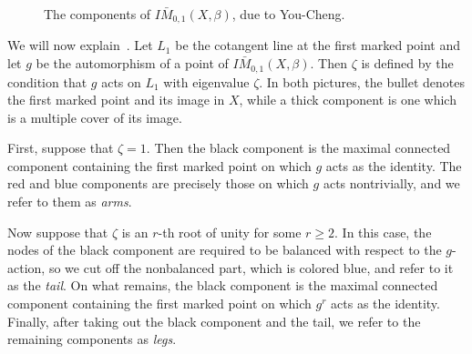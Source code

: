 \documentclass{amsart}
\theoremstyle{definition}
\theoremstyle{remark}
\theoremstyle{plain}
\theoremstyle{definition}
\theoremstyle{remark}
\newcommand{\1}{\mathbf{1}}
\newcommand{\2}{\mathbf{2}}
\newcommand{\3}{\mathbf{3}}
\begin{document}
\begin{figure}[htpb]
    \caption{The components of \(I\bar{M}_{0,1}(X,\beta)\), due to You-Cheng.}
    \label{fig:adelic-components}
\end{figure}

We will now explain~. Let \(L_1\) be the cotangent line at the first marked point and let \(g\) be the automorphism of a point of \(I\bar{M}_{0,1}(X,\beta)\). Then \(\zeta\) is defined by the condition that \(g\) acts on \(L_1\) with eigenvalue \(\zeta\). In both pictures, the bullet denotes the first marked point and its image in \(X\), while a thick component is one which is a multiple cover of its image.

First, suppose that \(\zeta = 1\). Then the black component is the maximal connected component containing the first marked point on which \(g\) acts as the identity. The red and blue components are precisely those on which \(g\) acts nontrivially, and we refer to them as \textit{arms}.

Now suppose that \(\zeta\) is an \(r\)-th root of unity for some \(r \geq 2\). In this case, the nodes of the black component are required to be balanced with respect to the \(g\)-action, so we cut off the nonbalanced part, which is colored blue, and refer to it as the \textit{tail}. On what remains, the black component is the maximal connected component containing the first marked point on which \(g^r\) acts as the identity. Finally, after taking out the black component and the tail, we refer to the remaining components as \textit{legs}.
\end{document}
